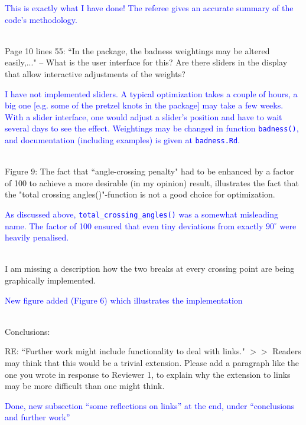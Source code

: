 \documentclass[12pt]{article}
\begin{document}
\textcolor{blue}{This is exactly what I have done!  The referee gives
  an accurate summary of the code's methodology.\\ \\}

Page 10 lines 55: ``In the package, the badness weightings may be
altered easily,..."  -- What is the user interface for this?  Are
there sliders in the display that allow interactive adjustments of the
weights?

\textcolor{blue}{I have not implemented sliders.  A typical
  optimization takes a couple of hours, a big one [e.g. some of the
    pretzel knots in the package] may take a few weeks.  With a slider
  interface, one would adjust a slider's position and have to wait
  several days to see the effect.  Weightings may be changed in
  function {\tt badness()}, and documentation (including examples) is
  given at {\tt badness.Rd}.\\ \\}

  
Figure 9: The fact that ``angle-crossing penalty" had to be enhanced by
a factor of 100 to achieve a more desirable (in my opinion) result,
illustrates the fact that the "total crossing angles()"-function is
not a good choice for optimization.

\textcolor{blue}{As discussed above, {\tt total\_crossing\_angles()}
  was a somewhat misleading name.  The factor of 100 ensured that even
  tiny deviations from exactly $90^\circ$ were heavily penalised.\\ \\}

I am missing a description how the two breaks at every crossing point
are being graphically implemented.

\textcolor{blue}{New figure added (Figure 6) which illustrates the
  implementation\\ \\}


Conclusions:

RE: ``Further work might include functionality to deal
with links."  $>>$ Readers may think that this would be a trivial
extension.  Please add a paragraph like the one you wrote in response
to Reviewer 1, to explain why the extension to links may be more
difficult than one might think.

\textcolor{blue}{Done, new subsection ``some reflections on links''
  at the end, under ``conclusions and further work''\\ \\}
\end{document}
